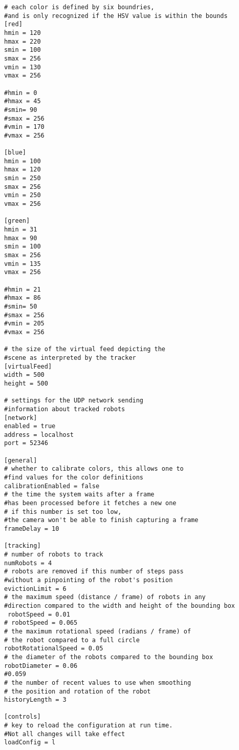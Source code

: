 \begin{lstlisting}
# each color is defined by six boundries,
#and is only recognized if the HSV value is within the bounds
[red]
hmin = 120
hmax = 220
smin = 100
smax = 256
vmin = 130
vmax = 256

#hmin = 0
#hmax = 45
#smin= 90
#smax = 256
#vmin = 170
#vmax = 256

[blue]
hmin = 100
hmax = 120
smin = 250
smax = 256
vmin = 250
vmax = 256

[green]
hmin = 31
hmax = 90
smin = 100
smax = 256
vmin = 135
vmax = 256

#hmin = 21
#hmax = 86
#smin= 50
#smax = 256
#vmin = 205
#vmax = 256

# the size of the virtual feed depicting the 
#scene as interpreted by the tracker
[virtualFeed]
width = 500
height = 500
 
# settings for the UDP network sending 
#information about tracked robots
[network]
enabled = true 
address = localhost
port = 52346

[general]
# whether to calibrate colors, this allows one to 
#find values for the color definitions
calibrationEnabled = false
# the time the system waits after a frame 
#has been processed before it fetches a new one
# if this number is set too low, 
#the camera won't be able to finish capturing a frame
frameDelay = 10

[tracking]
# number of robots to track
numRobots = 4
# robots are removed if this number of steps pass 
#without a pinpointing of the robot's position
evictionLimit = 6
# the maximum speed (distance / frame) of robots in any 
#direction compared to the width and height of the bounding box
 robotSpeed = 0.01
# robotSpeed = 0.065
# the maximum rotational speed (radians / frame) of
# the robot compared to a full circle
robotRotationalSpeed = 0.05
# the diameter of the robots compared to the bounding box
robotDiameter = 0.06
#0.059
# the number of recent values to use when smoothing
# the position and rotation of the robot
historyLength = 3

[controls]
# key to reload the configuration at run time. 
#Not all changes will take effect
loadConfig = l
\end{lstlisting}